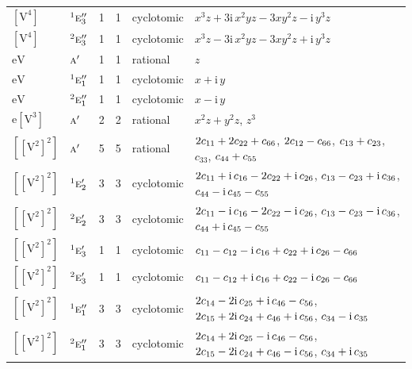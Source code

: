 \documentclass[10pt,a4paper]{article}
\numberwithin{equation}{section}
\newcommand{\irr}[1]{\text{\normalfont\scshape #1}}
\newcommand{\conjpair}[1]{{}^{#1}}
\newcommand{\iunit}{\mathrm{i}}
\newcommand{\jahn}[1]{\mathrm{#1}}
\newlength{\fillwidth}\newlength{\cellwidth}\newlength{\colwidth}
\newcommand{\signbreak}{\penalty100\relax}
\begin{document}
{\begin{longtable}{@{}llrrl>{\RaggedRight\arraybackslash}p{\fillwidth}@{}}
$\jahn{[V^{4}]}$ & $\conjpair{1}\irr{e}_{3}''$ & 1 & 1 & cyclotomic & $x^{3}z + 3\iunit{}\,x^{2}yz - 3xy^{2}z - \iunit{}\,y^{3}z$\\
$\jahn{[V^{4}]}$ & $\conjpair{2}\irr{e}_{3}''$ & 1 & 1 & cyclotomic & $x^{3}z - 3\iunit{}\,x^{2}yz - 3xy^{2}z + \iunit{}\,y^{3}z$\\
$\jahn{eV}$ & $\irr{a}'$ & 1 & 1 & rational & $z$\\
$\jahn{eV}$ & $\conjpair{1}\irr{e}_{1}''$ & 1 & 1 & cyclotomic & $x + \iunit{}\,y$\\
$\jahn{eV}$ & $\conjpair{2}\irr{e}_{1}''$ & 1 & 1 & cyclotomic & $x - \iunit{}\,y$\\
$\jahn{e[V^{3}]}$ & $\irr{a}'$ & 2 & 2 & rational & $x^{2}z + y^{2}z$, $z^{3}$\\
$\jahn{[[V^{2}]^{2}]}$ & $\irr{a}'$ & 5 & 5 & rational & $2c_{11} +\signbreak 2c_{22} +\signbreak c_{66}$, $2c_{12} -\signbreak c_{66}$, $c_{13} +\signbreak c_{23}$, $c_{33}$, $c_{44} +\signbreak c_{55}$\\
$\jahn{[[V^{2}]^{2}]}$ & $\conjpair{1}\irr{e}_{2}'$ & 3 & 3 & cyclotomic & $2c_{11} +\signbreak \iunit{}\,c_{16} -\signbreak 2c_{22} +\signbreak \iunit{}\,c_{26}$, $c_{13} -\signbreak c_{23} +\signbreak \iunit{}\,c_{36}$, $c_{44} -\signbreak \iunit{}\,c_{45} -\signbreak c_{55}$\\
$\jahn{[[V^{2}]^{2}]}$ & $\conjpair{2}\irr{e}_{2}'$ & 3 & 3 & cyclotomic & $2c_{11} -\signbreak \iunit{}\,c_{16} -\signbreak 2c_{22} -\signbreak \iunit{}\,c_{26}$, $c_{13} -\signbreak c_{23} -\signbreak \iunit{}\,c_{36}$, $c_{44} +\signbreak \iunit{}\,c_{45} -\signbreak c_{55}$\\
$\jahn{[[V^{2}]^{2}]}$ & $\conjpair{1}\irr{e}_{3}'$ & 1 & 1 & cyclotomic & $c_{11} -\signbreak c_{12} -\signbreak \iunit{}\,c_{16} +\signbreak c_{22} +\signbreak \iunit{}\,c_{26} -\signbreak c_{66}$\\
$\jahn{[[V^{2}]^{2}]}$ & $\conjpair{2}\irr{e}_{3}'$ & 1 & 1 & cyclotomic & $c_{11} -\signbreak c_{12} +\signbreak \iunit{}\,c_{16} +\signbreak c_{22} -\signbreak \iunit{}\,c_{26} -\signbreak c_{66}$\\
$\jahn{[[V^{2}]^{2}]}$ & $\conjpair{1}\irr{e}_{1}''$ & 3 & 3 & cyclotomic & $2c_{14} -\signbreak 2\iunit{}\,c_{25} +\signbreak \iunit{}\,c_{46} -\signbreak c_{56}$, $2c_{15} +\signbreak 2\iunit{}\,c_{24} +\signbreak c_{46} +\signbreak \iunit{}\,c_{56}$, $c_{34} -\signbreak \iunit{}\,c_{35}$\\
$\jahn{[[V^{2}]^{2}]}$ & $\conjpair{2}\irr{e}_{1}''$ & 3 & 3 & cyclotomic & $2c_{14} +\signbreak 2\iunit{}\,c_{25} -\signbreak \iunit{}\,c_{46} -\signbreak c_{56}$, $2c_{15} -\signbreak 2\iunit{}\,c_{24} +\signbreak c_{46} -\signbreak \iunit{}\,c_{56}$, $c_{34} +\signbreak \iunit{}\,c_{35}$\\

\end{longtable}}
\end{document}
